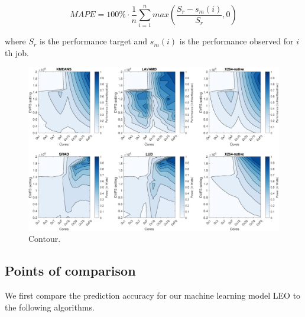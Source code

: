 \begin{equation}
MAPE = 100\% \cdot \frac{1}{n} \sum\limits_{i=1}^{n} max \left( \frac{S_{r} - s_m(i)}{S_r},0 \right)
\end{equation}

where $S_{r}$ is the performance target and $s_m(i)$ is the
performance observed for $i$th job.

\begin{figure}
\centering
\includegraphics[scale=0.4]{figures/sample-contour3.png}

\caption{Contour.}
  \label{fig:contour}
\end{figure}
\subsection{Points of comparison}
We first compare the prediction accuracy for our machine learning
model LEO to the following algorithms.

